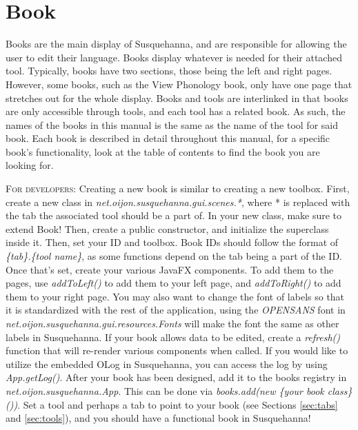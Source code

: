\documentclass{report}
\begin{document}
	\section{Book}\label{sec:book}
	Books are the main display of Susquehanna, and are responsible for allowing the user to edit their language. Books display whatever is needed for their attached tool. Typically, books have two sections, those being the left and right pages. However, some books, such as the View Phonology book, only have one page that stretches out for the whole display. Books and tools are interlinked in that books are only accessible through tools, and each tool has a related book. As such, the names of the books in this manual is the same as the name of the tool for said book. Each book is described in detail throughout this manual, for a specific book's functionality, look at the table of contents to find the book you are looking for.
	\par
	\begin{tcolorbox}[width=1\textwidth]
		\textsc{For developers:} Creating a new book is similar to creating a new toolbox. First, create a new class in \emph{net.oijon.susquehanna.gui.scenes.*}, where * is replaced with the tab the associated tool should be a part of. In your new class, make sure to extend Book! Then, create a public constructor, and initialize the superclass inside it. Then, set your ID and toolbox. Book IDs should follow the format of \emph{\{tab\}.\{tool name\}}, as some functions depend on the tab being a part of the ID. Once that's set, create your various JavaFX components. To add them to the pages, use \emph{addToLeft()} to add them to your left page, and \emph{addToRight()} to add them to your right page. You may also want to change the font of labels so that it is standardized with the rest of the application, using the \emph{OPENSANS} font in \emph{net.oijon.susquehanna.gui.resources.Fonts} will make the font the same as other labels in Susquehanna. If your book allows data to be edited, create a \emph{refresh()} function that will re-render various components when called. If you would like to utilize the embedded OLog in Susquehanna, you can access the log by using \emph{App.getLog()}. After your book has been designed, add it to the books registry in \emph{net.oijon.susquehanna.App}. This can be done via \emph{books.add(new \{your book class\}())}. Set a tool and perhaps a tab to point to your book (see Sections \ref{sec:tabs} and \ref{sec:tools}), and you should have a functional book in Susquehanna!
	\end{tcolorbox}
	
\end{document}
